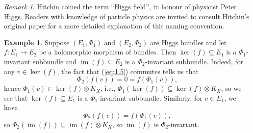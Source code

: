 \documentclass[10pt]{amsart}
\numberwithin{equation}{section}
\newcommand{\im}{\mathop{\mathrm{im}}}
\theoremstyle{plain}
\theoremstyle{definition}
\newtheorem{ex}[thm]{Example}
\theoremstyle{remark}
\newtheorem*{rmk}{Remark}
\begin{document}
\begin{rmk}
    Hitchin coined the term ``Higgs field'', in honour of physicist Peter Higgs. Readers with knowledge of particle physics are invited to consult Hitchin's original paper \cite{hitchin1987A} for a more detailed explanation of this naming convention. 
\end{rmk}


\begin{ex}\label{ex:1.23}
    Suppose $(E_1, \Phi_1)$ and $(E_2, \Phi_2)$ are Higgs bundles and let $f: E_1 \to E_2$ be a holomorphic morphism of bundles. Then $\ker(f) \subseteq E_1$ is a $\Phi_1$-invariant subbundle and $\im(f) \subseteq E_2$ is a $\Phi_2$-invariant subbundle. Indeed, for any $v \in \ker(f)$, the fact that (\ref{eq:1.5}) commutes tells us that 
    \[\Phi_2(f(v)) = 0 = f(\Phi_1(v)),\]
    hence $\Phi_1(v) \in \ker(f) \otimes K_X$, i.e., $\Phi_1(\ker(f)) \subseteq \ker(f) \otimes K_X$, so we see that $\ker(f) \subseteq E_1$ is a $\Phi_1$-invariant subbundle. Similarly, for $v \in E_1$, we have
    \[\Phi_2(f(v)) = f(\Phi_1(v)),\]
    so $\Phi_2(\im(f)) \subseteq \im(f) \otimes K_X$, so $\im(f)$ is $\Phi_2$-invariant.
\end{ex}
\end{document}
